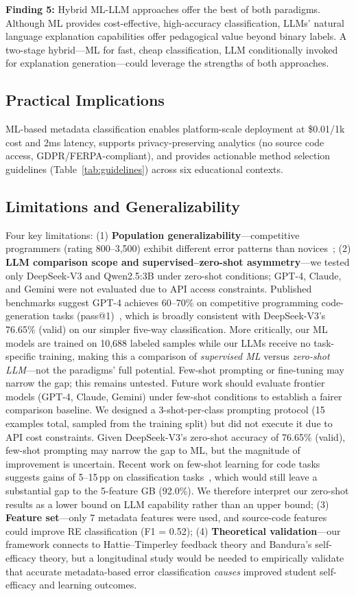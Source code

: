 \documentclass[acmsmall]{acmart}
\begin{document}
\textbf{Finding 5:} Hybrid ML-LLM approaches offer the best of both paradigms.
Although ML provides cost-effective, high-accuracy classification, LLMs'
natural language explanation capabilities offer pedagogical value beyond
binary labels. A two-stage hybrid---ML for fast, cheap classification, LLM
conditionally invoked for explanation generation---could leverage the
strengths of both approaches.

\subsection*{Practical Implications}
ML-based metadata classification enables platform-scale deployment at
\$0.01/1k cost and 2ms latency, supports privacy-preserving analytics (no
source code access, GDPR/FERPA-compliant), and provides actionable method
selection guidelines (Table~\ref{tab:guidelines}) across six educational
contexts.

\subsection*{Limitations and Generalizability}
Four key limitations: (1) \textbf{Population generalizability}---competitive
programmers (rating 800--3,500) exhibit different error patterns than
novices~\cite{lee2022cs1qa,brown2014blackbox}; (2) \textbf{LLM comparison scope and supervised--zero-shot asymmetry}---we tested
only DeepSeek-V3 and Qwen2.5:3B under zero-shot conditions; GPT-4, Claude, and Gemini
were not evaluated due to API access constraints. Published benchmarks suggest
GPT-4 achieves 60--70\% on competitive programming code-generation tasks
(pass@1)~\cite{jin2024crosscodebench}, which is broadly consistent with DeepSeek-V3's
76.65\% (valid) on our simpler five-way classification. More critically, our ML models
are trained on 10,688 labeled samples while our LLMs receive no task-specific training,
making this a comparison of \emph{supervised ML} versus \emph{zero-shot LLM}---not the
paradigms' full potential. Few-shot prompting or fine-tuning may narrow the gap;
this remains untested. Future work should evaluate frontier models (GPT-4, Claude,
Gemini) under few-shot conditions to establish a fairer comparison baseline. We
designed a 3-shot-per-class prompting protocol (15 examples total, sampled from
the training split) but did not execute it due to API cost constraints. Given
DeepSeek-V3's zero-shot accuracy of 76.65\% (valid), few-shot prompting may narrow
the gap to ML, but the magnitude of improvement is uncertain. Recent work on
few-shot learning for code tasks suggests gains of 5--15\,pp on classification
tasks~\cite{liu2023fewshot}, which would still leave a substantial gap to the
5-feature GB (92.0\%). We therefore interpret our zero-shot results as a lower
bound on LLM capability rather than an upper bound; (3) \textbf{Feature
set}---only 7 metadata features were used, and source-code features could
improve RE classification (F1 = 0.52); (4) \textbf{Theoretical validation}---our
framework connects to Hattie--Timperley feedback theory and Bandura's
self-efficacy theory, but a longitudinal study would be needed to empirically
validate that accurate metadata-based error classification \emph{causes}
improved student self-efficacy and learning outcomes.
\end{document}
